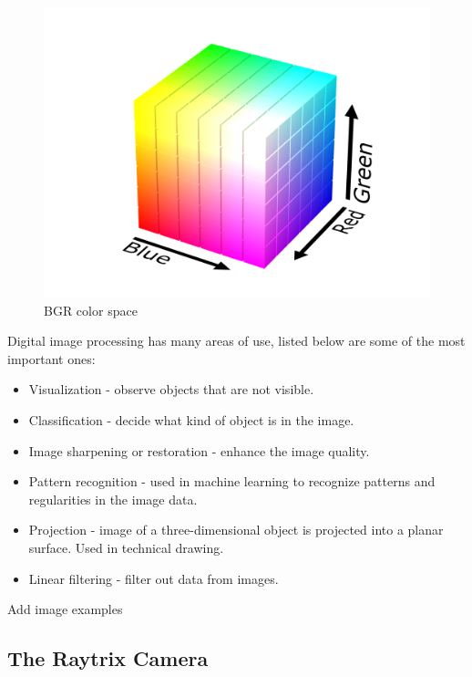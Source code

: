 \begin{figure}[h]
    \centering
    \includegraphics[width=.9\linewidth]{Images/RGB_color_solid_cube}
    \caption{BGR color space}
    \label{fig:bgr_color_space}
\end{figure}


Digital image processing has many areas of use, listed below are some of the most important ones:
\begin{itemize}
\item Visualization - observe objects that are not visible.
\item Classification - decide what kind of object is in the image.
\item Image sharpening or restoration - enhance the image quality.
\item Pattern recognition - used in machine learning to recognize patterns and regularities in the image data.
\item Projection - image of a three-dimensional object is projected into a planar surface. Used in technical drawing.
\item Linear filtering - filter out data from images.
\end{itemize}
 

\cite{book:digital_image_processing}

{\color{red}Add image examples}



\subsection{The Raytrix Camera}

